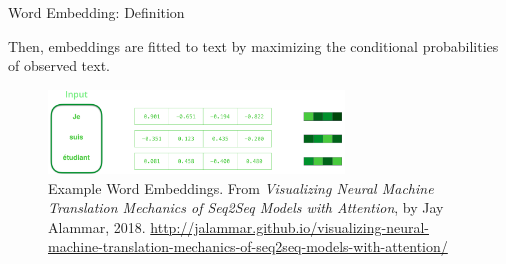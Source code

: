\begin{frame}{Word Embedding: Definition}
\begin{itemizeSpaced}{3pt}
{\begin{itemizeSpaced}{1pt}
            \arrowitem Then, embeddings are fitted to text by maximizing the conditional probabilities of observed text.
            
        \end{itemizeSpaced}}
        
    \end{itemizeSpaced}
    
    \begin{figure}[h]
    \vspace{-10pt}
    \centering
    \includegraphics[width=0.7\textwidth]{imgs/example_word_embedding.png}
    \vspace{-10pt}
    \caption{\linespread{0.1}\scriptsize Example Word Embeddings. From \emph{Visualizing Neural Machine Translation Mechanics of Seq2Seq Models with Attention}, by Jay Alammar, 2018. \url{http://jalammar.github.io/visualizing-neural-machine-translation-mechanics-of-seq2seq-models-with-attention/}}
    \vspace{-10pt}
    \label{fig:exampleWordEmb}
    \end{figure}
    
\end{frame}




